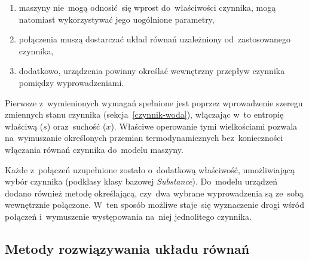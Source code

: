 \begin{enumerate}

	\item maszyny nie~mogą odnosić~się wprost do~właściwości czynnika,
		mogą natomiast wykorzystywać jego uogólnione parametry,

	\item połączenia muszą dostarczać układ równań uzależniony
		od~zastosowanego czynnika,

	\item dodatkowo, urządzenia powinny określać wewnętrzny przepływ
		czynnika pomiędzy wyprowadzeniami.

\end{enumerate}

Pierwsze z~wymienionych wymagań spełnione jest poprzez wprowadzenie
szeregu zmiennych stanu czynnika (sekcja~\ref{czynnik-woda}), włączając
w~to entropię właściwą ($s$) oraz~suchość ($x$). Właściwe operowanie
tymi wielkościami pozwala na~wymuszanie określonych przemian
termodynamicznych bez~konieczności włączania równań czynnika do~modelu
maszyny.

Każde z~połączeń uzupełnione zostało o~dodatkową właściwość,
umożliwiającą wybór czynnika (podklasy klasy bazowej
\textit{Substance}). Do~modelu urządzeń dodano również metodę
określającą, czy~dwa wybrane wyprowadzenia są ze~sobą wewnętrznie
połączone. W~ten sposób możliwe staje~się wyznaczenie drogi wśród
połączeń i~wymuszenie występowania na~niej jednolitego czynnika.


\subsection{Metody rozwiązywania układu równań}

\label{rozw-ukl-rown}
